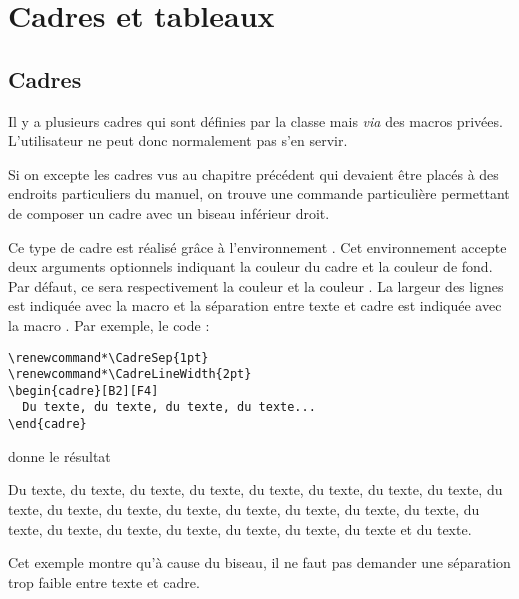 \documentclass[nocrop]{sesamanuel}
\begin{document}
\section{Cadres et tableaux}
\subsection{Cadres}
Il y a plusieurs cadres qui sont définies par la classe mais
\emph{via} des macros privées. L'utilisateur ne peut donc normalement
pas s'en servir.
\begin{cadre}
  Si on excepte les cadres vus au chapitre précédent qui devaient être
  placés à des endroits particuliers du manuel, on trouve une commande
  particulière permettant de composer un cadre avec un biseau
  inférieur droit.
\end{cadre}
Ce type de cadre est réalisé grâce à l'environnement
. Cet environnement accepte deux arguments optionnels
indiquant la couleur du cadre et la couleur de fond. Par défaut, ce
sera respectivement la couleur  et la couleur
. La largeur des lignes est indiquée avec la macro
 et la séparation entre texte et cadre est
indiquée avec la macro . Par exemple, le code :
\begin{verbatim}
\renewcommand*\CadreSep{1pt}
\renewcommand*\CadreLineWidth{2pt}
\begin{cadre}[B2][F4]
  Du texte, du texte, du texte, du texte...
\end{cadre}
\end{verbatim}
donne le résultat
\begingroup
\renewcommand*\CadreSep{1pt}
\renewcommand*\CadreLineWidth{2pt}
\begin{cadre}[B2][F4]
  Du texte, du texte, du texte, du texte, du texte, du texte, du
  texte, du texte, du texte, du texte, du texte, du texte, du texte,
  du texte, du texte, du texte, du texte, du texte, du texte, du
  texte, du texte, du texte, du texte et du texte.
\end{cadre}
\endgroup
Cet exemple montre qu'à cause du biseau, il ne faut pas demander une
séparation trop faible entre texte et cadre.
\end{document}
